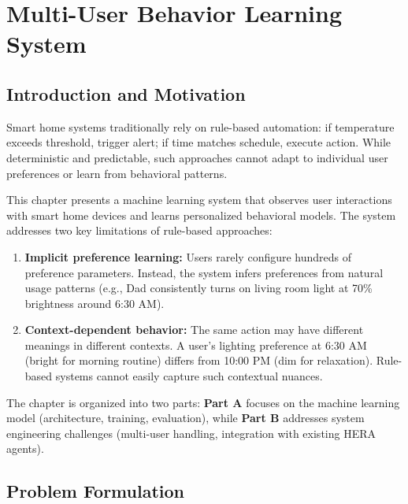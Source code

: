 \newpage
\section{Multi-User Behavior Learning System}
\label{sec:behavior-learning}

\subsection{Introduction and Motivation}

Smart home systems traditionally rely on rule-based automation: if temperature exceeds threshold, trigger alert; if time matches schedule, execute action. While deterministic and predictable, such approaches cannot adapt to individual user preferences or learn from behavioral patterns.

This chapter presents a machine learning system that observes user interactions with smart home devices and learns personalized behavioral models. The system addresses two key limitations of rule-based approaches:

\begin{enumerate}
    \item \textbf{Implicit preference learning:} Users rarely configure hundreds of preference parameters. Instead, the system infers preferences from natural usage patterns (e.g., Dad consistently turns on living room light at 70\% brightness around 6:30 AM).
    
    \item \textbf{Context-dependent behavior:} The same action may have different meanings in different contexts. A user's lighting preference at 6:30 AM (bright for morning routine) differs from 10:00 PM (dim for relaxation). Rule-based systems cannot easily capture such contextual nuances.
\end{enumerate}

The chapter is organized into two parts: \textbf{Part A} focuses on the machine learning model (architecture, training, evaluation), while \textbf{Part B} addresses system engineering challenges (multi-user handling, integration with existing HERA agents).

\subsection{Problem Formulation}
\label{sec:problem-formulation}

